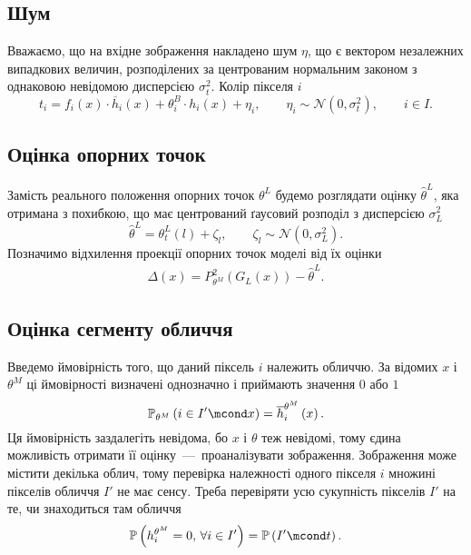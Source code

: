 \subsection{Шум}

Вважаємо,
що на вхідне зображення накладено шум $\eta$,
що є вектором незалежних випадкових величин,
розподілених за центрованим нормальним законом
з однаковою невідомою дисперсією $\sigma_t^2$.
Колір пікселя $i$
\begin{equation*}
  t_i = f_i\left( x \right) \cdot \overline{h}_i\left( x \right)
    + \theta_i^B \cdot h_i\left( x \right) + \eta_i,\qquad
  \eta_i \sim \mathcal{N}\left( 0, \sigma^2_t\right), \qquad
  i \in I.
\end{equation*}

\subsection{Оцінка опорних точок}

Замість реального положення опорних точок $\theta^L$
будемо розглядати оцінку $\hat{\theta}^L$,
яка отримана з похибкою,
що має центрований ґаусовий розподіл
з дисперсією $\sigma^2_L$
\begin{equation*}
  \hat{\theta}^L = \theta_t^L\left( l \right) + \zeta_l,
  \qquad \zeta_l \sim \mathcal{N}\left( 0, \sigma_L^2 \right).
\end{equation*}
Позначимо відхилення проекції опорних точок моделі
від їх оцінки
\begin{align*}
  \Delta\left( x \right)
  = P^2_{\theta^M}\left( G_L\left( x \right) \right) - \hat{\theta}^L.
\end{align*}

\subsection{Оцінка сегменту обличчя}

Введемо ймовірність того, що даний піксель $i$ належить обличчю.
За відомих $x$ і $\theta^M$ ці ймовірності визначені однозначно
і приймають значення $0$ або $1$
\begin{equation*}
  \mathbb{P}_{\theta^M}\left( i \in I' \mcond x \right)
  = \overline{h}_i^{\theta^M}\left( x \right).
\end{equation*}
Ця ймовірність заздалегіть невідома, бо $x$ і $\theta$ теж невідомі,
тому єдина можливість отримати її оцінку~---~проаналізувати зображення.
Зображення може містити декілька облич,
тому перевірка належності одного пікселя $i$ множині пікселів обличчя $I'$
не має сенсу.
Треба перевіряти усю сукупність пікселів $I'$ на те,
чи знаходиться там обличчя
\begin{equation*}
  \mathbb{P}\left( h_i^{\theta^M} = 0, \, \forall i \in I' \right)
  = \mathbb{P}\left( I' \mcond t \right).
\end{equation*}


